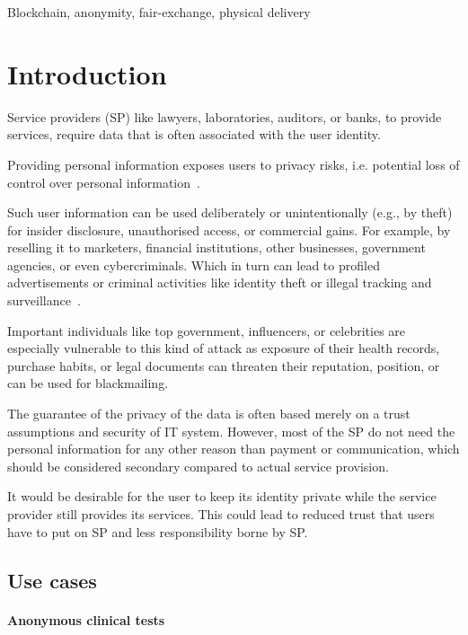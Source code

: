 \documentclass{ieeeaccess}
\begin{document}
\begin{keywords}
Blockchain, anonymity, fair-exchange, physical delivery
\end{keywords}

\titlepgskip=-15pt

\maketitle
\section{Introduction}
Service providers (SP) like lawyers, laboratories, auditors, or banks,
to provide services, require data that is often associated with the user
identity.

Providing personal information exposes users to privacy risks,
i.e. potential loss of control over personal
information~\cite{smith2011information}.

Such user information can be used deliberately or unintentionally
(e.g., by theft) for insider disclosure, unauthorised access, or
commercial gains. For example, by reselling it to marketers, financial
institutions, other businesses, government agencies, or even
cybercriminals. Which in turn can lead to profiled advertisements or
criminal activities like identity theft or illegal tracking and
surveillance~\cite{smith2011information}.

Important individuals like top government, influencers, or celebrities are especially vulnerable to this kind of attack as exposure of their
health records, purchase habits, or legal documents can threaten their
reputation, position, or can be used for blackmailing.

The guarantee of the privacy of the data is often based merely on a
trust assumptions and security of IT system. However, most of the SP
do not need the personal information for any other reason than payment
or communication, which should be considered secondary compared to
actual service provision.

It would be desirable for the user to keep its identity private while the service provider still provides its services. This could lead to reduced
trust that users have to put on SP and less responsibility borne by SP.


\subsection{Use cases}
\paragraph{Anonymous clinical tests} \label{anonymous-clinical-tests}
\end{document}
